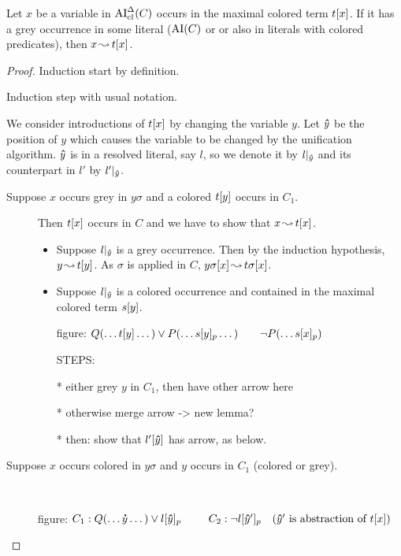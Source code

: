 \documentclass[,%
	paper=a4,%
	DIV11, %
	twoside=false,%
	liststotoc,
	bibtotoc,
	draft=false,%
	numbers=noendperiod
]{scrartcl}
\begin{document}
\begin{clemma}
	\label{lemma:arrow_from_grey_to_colored}
	Let $x$ be a variable in $\operatorname{AI}_\mathrm{cl}^\Delta(C)$ occurs in the maximal colored term $t[x]$.
	If it has a grey occurrence in some literal ($\operatorname{AI}(C)$ or or also in literals with colored predicates), then $x\operatorname{\leadsto} t[x]$.
\end{clemma}
\begin{proof}
	Induction start by definition.

	Induction step with usual notation.

	We consider introductions of $t[x]$ by changing the variable $y$.
	Let $\bm\hat y$ be the position of $y$ which causes the variable to be changed by the unification algorithm.
	$\bm\hat y$ is in a resolved literal, say $l$, so we denote it by $l|_{\bm\hat y}$ and its counterpart in $l'$ by $l'|_{\bm\hat y}$. 

	\begin{description}
		\item[Suppose $x$ occurs grey in $y\sigma$ and a colored $t[y]$ occurs in $C_1$.]
			Then $t[x]$ occurs in $C$ and we have to show that $x\operatorname{\leadsto} t[x]$.

			\begin{itemize}
				\item Suppose $l|_{\bm\hat y}$ is a grey occurrence.
					Then by the induction hypothesis, $y\operatorname{\leadsto} t[y]$. 
					As $\sigma$ is applied in $C$, $y\sigma[x]\operatorname{\leadsto} t\sigma[x]$.
				\item Suppose $l|_{\bm\hat y}$ is a colored occurrence and contained in the maximal colored term $s[y]$.

					figure: $Q(\dots t[y] \dots) \lor P(\dots s{[y]_{p}} \dots)\quad\quad \lnot P(\dots s{[x]_{p}})$

					\mytodo{}
					STEPS:

					* either grey $y$ in $C_1$, then have other arrow here

					* otherwise merge arrow -> new lemma?

					* then: show that $l'[\bm\hat y]$ has arrow, as below.


			\end{itemize}

		\item[Suppose $x$ occurs colored in $y\sigma$ and $y$ occurs in $C_1$ (colored or grey).]
			~

			figure:
			$C_1: Q(\dots \bdot y \dots) \lor l\occat{\bhat y}{p}\quad\quad$
			$C_2: \lnot l{[\bm\hat y']_{p}}\quad(\bm\hat y' \text{ is abstraction of } t[x])$



\end{description}
\end{proof}
\end{document}
